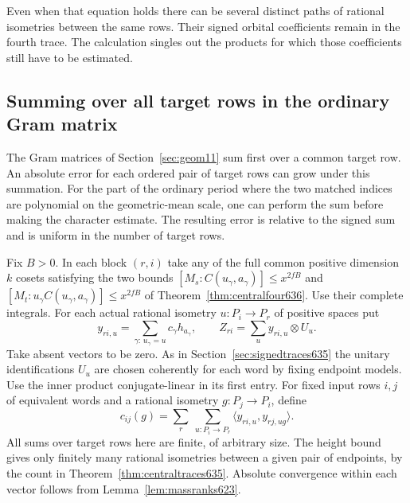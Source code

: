 \documentclass[a4paper,11pt]{article}
\theoremstyle{definition}
\theoremstyle{remark}
\numberwithin{equation}{section}
\begin{document}
Even when that equation holds there can be several distinct paths
of rational isometries between the same rows. Their signed orbital
coefficients remain in the fourth trace. The calculation singles out
the products for which those coefficients still have to be estimated.


\subsection{Summing over all target rows in the ordinary Gram matrix}
\label{sec:rowsums637}

The Gram matrices of Section~\ref{sec:geom11} sum first over a
common target row. An absolute error for each ordered pair of
target rows can grow under this summation. For the part of the
ordinary period where the two matched indices are polynomial on
the geometric-mean scale, one can perform the sum before making
the character estimate. The resulting error is relative to the
signed sum and is uniform in the number of target rows.

Fix \(B>0\). In each block \((r,i)\) take any of the full common
positive dimension \(k\) cosets satisfying the two bounds
\([M_s:C(u_\gamma,a_\gamma)]\le x^{2fB}\) and
\([M_t:u_\gamma C(u_\gamma,a_\gamma)]\le x^{2fB}\) of
Theorem~\ref{thm:centralfour636}. Use their complete integrals.
For each actual rational isometry \(u:P_i\to P_r\) of positive
spaces put
\[
       y_{ri,u}=\sum_{\gamma:\,u_\gamma=u}
                                  c_\gamma h_{a_\gamma},\qquad
       Z_{ri}=\sum_u y_{ri,u}\otimes U_u .
\]
Take absent vectors to be zero. As in Section~\ref{sec:signedtraces635}
the unitary identifications \(U_u\) are chosen coherently for each
word by fixing endpoint models. Use the inner product conjugate-linear
in its first entry. For fixed input rows \(i,j\) of equivalent words
and a rational isometry \(g:P_j\to P_i\), define
\[
       c_{ij}(g)=\sum_r\ \sum_{u:P_i\to P_r}
                          \langle y_{ri,u},y_{rj,ug}\rangle .
\]
All sums over target rows here are finite, of arbitrary size.
The height bound gives only finitely many rational isometries
between a given pair of endpoints, by the count in
Theorem~\ref{thm:centraltraces635}. Absolute convergence within
each vector follows from Lemma~\ref{lem:massranks623}.
\end{document}
